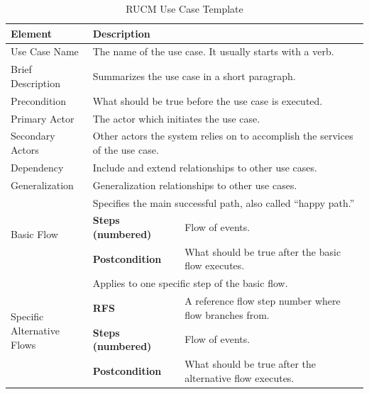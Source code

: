 \begin{table}[htbp]
  \centering
  \caption{RUCM Use Case Template \cite{yue2013facilitating}}
	\begin{adjustbox}{width=1\textwidth}
    \begin{tabular}{|l|l|l|l|l|l|l|l|}
    \toprule
    Element & \multicolumn{7}{l|}{ Description} \\
    \midrule
    Use Case Name & \multicolumn{7}{l|}{ The name of the use case. It usually starts with a verb.} \\
    \midrule
    Brief Description  & \multicolumn{7}{l|}{Summarizes the use case in a short paragraph.} \\
    \midrule
    Precondition & \multicolumn{7}{l|}{ What should be true before the use case is executed.} \\
    \midrule
    Primary Actor  & \multicolumn{7}{l|}{The actor which initiates the use case.} \\
    \midrule
    Secondary Actors & \multicolumn{7}{l|}{ Other actors the system relies on to accomplish the services of the use case.} \\
    \midrule
    Dependency & \multicolumn{7}{l|}{ Include and extend relationships to other use cases.} \\
    \midrule
    Generalization & \multicolumn{7}{l|}{ Generalization relationships to other use cases.} \\
    \midrule
    \multirow{3}[6]{*}{Basic Flow} & \multicolumn{7}{l|}{ Specifies the main successful path, also called “happy path.”} \\
\cmidrule{2-8}          & \textbf{Steps (numbered) } & \multicolumn{6}{l|}{Flow of events.} \\
\cmidrule{2-8}          & \textbf{Postcondition} & \multicolumn{6}{l|}{ What should be true after the basic flow executes.} \\
    \midrule
    \multicolumn{1}{|l|}{\multirow{4}[8]{*}{Specific \newline{}Alternative Flows}} & \multicolumn{7}{l|}{Applies to one specific step of the basic flow.} \\
\cmidrule{2-8}          & \textbf{RFS} & \multicolumn{6}{l|}{ A reference flow step number where flow branches from.} \\
\cmidrule{2-8}          & \textbf{Steps (numbered)} & \multicolumn{6}{l|}{ Flow of events.} \\
\cmidrule{2-8}          & \textbf{Postcondition} & \multicolumn{6}{l|}{ What should be true after the alternative flow executes.} \\

\end{tabular}
\end{adjustbox}
\end{table}
